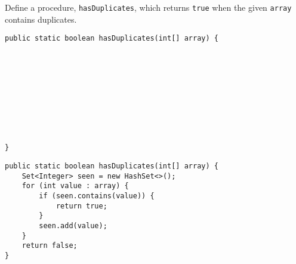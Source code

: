 \begin{blocksection}
\question Define a procedure, \lstinline$hasDuplicates$, which returns
\lstinline$true$ when the given \lstinline$array$ contains duplicates.

\ifprintanswers\else
\begin{lstlisting}
public static boolean hasDuplicates(int[] array) {










}
\end{lstlisting}
\fi

\begin{solution}
\begin{lstlisting}
public static boolean hasDuplicates(int[] array) {
    Set<Integer> seen = new HashSet<>();
    for (int value : array) {
        if (seen.contains(value)) {
            return true;
        }
        seen.add(value);
    }
    return false;
}
\end{lstlisting}
\end{solution}
\end{blocksection}
